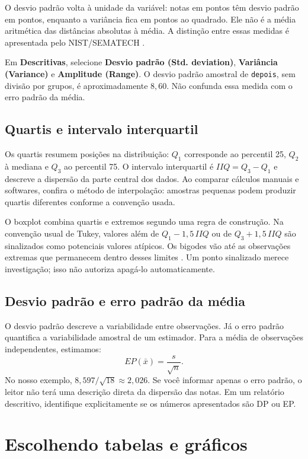 O desvio padrão volta à unidade da variável: notas em pontos têm desvio padrão em pontos, enquanto a variância fica em pontos ao quadrado. Ele não é a média aritmética das distâncias absolutas à média. A distinção entre essas medidas é apresentada pelo NIST/SEMATECH \parencite{NISTDispersao}.

Em \textbf{Descritivas}, selecione \textbf{Desvio padrão (Std. deviation)}, \textbf{Variância (Variance)} e \textbf{Amplitude (Range)}. O desvio padrão amostral de \texttt{depois}, sem divisão por grupos, é aproximadamente $8{,}60$. Não confunda essa medida com o erro padrão da média.

\subsection{Quartis e intervalo interquartil}

Os quartis resumem posições na distribuição: $Q_1$ corresponde ao percentil 25, $Q_2$ à mediana e $Q_3$ ao percentil 75. O intervalo interquartil é $IIQ=Q_3-Q_1$ e descreve a dispersão da parte central dos dados. Ao comparar cálculos manuais e softwares, confira o método de interpolação: amostras pequenas podem produzir quartis diferentes conforme a convenção usada.

O boxplot combina quartis e extremos segundo uma regra de construção. Na convenção usual de Tukey, valores além de $Q_1-1{,}5\,IIQ$ ou de $Q_3+1{,}5\,IIQ$ são sinalizados como potenciais valores atípicos. Os bigodes vão até as observações extremas que permanecem dentro desses limites \parencite{NISTBoxplot}. Um ponto sinalizado merece investigação; isso não autoriza apagá-lo automaticamente.

\subsection{Desvio padrão e erro padrão da média}

O desvio padrão descreve a variabilidade entre observações. Já o erro padrão quantifica a variabilidade amostral de um estimador. Para a média de observações independentes, estimamos:
\[
EP(\bar{x})=\frac{s}{\sqrt{n}}.
\]
No nosso exemplo, $8{,}597/\sqrt{18}\approx2{,}026$. Se você informar apenas o erro padrão, o leitor não terá uma descrição direta da dispersão das notas. Em um relatório descritivo, identifique explicitamente se os números apresentados são DP ou EP.

\section{Escolhendo tabelas e gráficos}

